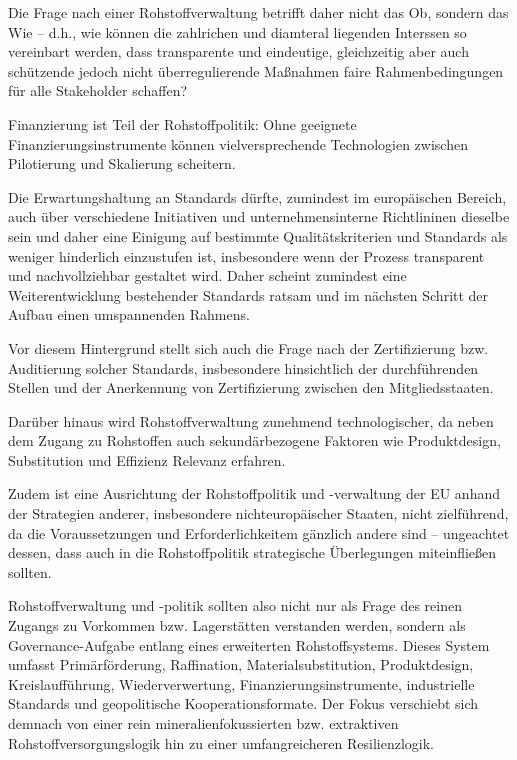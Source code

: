 \documentclass[12pt,a4paper,oneside]{book} %
\begin{document}
{Die Frage nach einer Rohstoffverwaltung betrifft daher nicht das Ob, sondern das Wie -- d.h., wie können die zahlrichen und diamteral liegenden Interssen so vereinbart werden, dass transparente und eindeutige, gleichzeitig aber auch schützende jedoch nicht überregulierende Maßnahmen faire Rahmenbedingungen für alle Stakeholder schaffen?

Finanzierung ist Teil der Rohstoffpolitik: Ohne geeignete Finanzierungsinstrumente können vielversprechende Technologien zwischen Pilotierung und Skalierung scheitern.

Die Erwartungshaltung an Standards dürfte, zumindest im europäischen Bereich, auch über verschiedene Initiativen und unternehmensinterne Richtlininen dieselbe sein und daher eine Einigung auf bestimmte Qualitätskriterien und Standards als weniger hinderlich einzustufen ist, insbesondere wenn der Prozess transparent und nachvollziehbar gestaltet wird. Daher scheint zumindest eine Weiterentwicklung bestehender Standards ratsam und im nächsten Schritt der Aufbau einen umspannenden Rahmens.

Vor diesem Hintergrund stellt sich auch die Frage nach der Zertifizierung bzw. Auditierung solcher Standards, insbesondere hinsichtlich der durchführenden Stellen und der Anerkennung von Zertifizierung zwischen den Mitgliedsstaaten.

Darüber hinaus wird Rohstoffverwaltung zunehmend technologischer, da neben dem Zugang zu Rohstoffen auch sekundärbezogene Faktoren wie Produktdesign, Substitution und Effizienz Relevanz erfahren.

Zudem ist eine Ausrichtung der Rohstoffpolitik und -verwaltung der EU anhand der Strategien anderer, insbesondere nichteuropäischer Staaten, nicht zielführend, da die Voraussetzungen und Erforderlichkeitem gänzlich andere sind -- ungeachtet dessen, dass auch in die Rohstoffpolitik strategische Überlegungen miteinfließen sollten.

Rohstoffverwaltung und -politik sollten also nicht nur als Frage des reinen Zugangs zu Vorkommen bzw. Lagerstätten verstanden werden, sondern als Governance-Aufgabe entlang eines erweiterten Rohstoffsystems. Dieses System umfasst Primärförderung, Raffination, Materialsubstitution, Produktdesign, Kreislaufführung, Wiederverwertung, Finanzierungsinstrumente, industrielle Standards und geopolitische Kooperationsformate. Der Fokus verschiebt sich demnach von einer rein mineralienfokussierten bzw. extraktiven Rohstoffversorgungslogik hin zu einer umfangreicheren Resilienzlogik.

}
\end{document}
